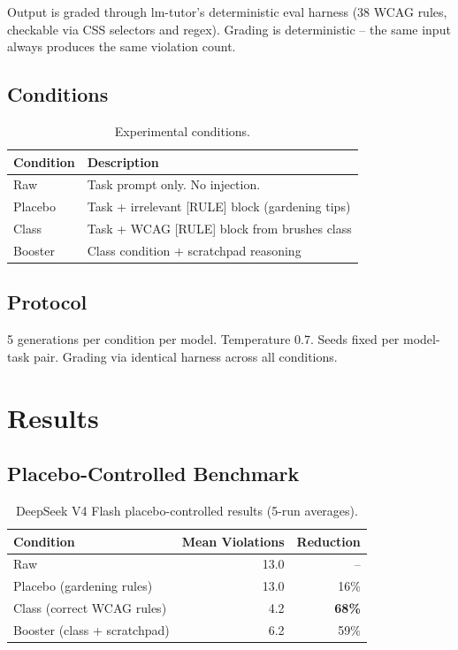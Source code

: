 \documentclass{article}
\begin{document}
Output is graded through lm-tutor's deterministic eval harness (38 WCAG rules,
checkable via CSS selectors and regex). Grading is deterministic -- the same
input always produces the same violation count.

\subsection{Conditions}

\begin{table}[h]
\centering
\begin{tabular}{ll}
\toprule
Condition & Description \\
\midrule
Raw & Task prompt only. No injection. \\
Placebo & Task + irrelevant [RULE] block (gardening tips) \\
Class & Task + WCAG [RULE] block from brushes class \\
Booster & Class condition + scratchpad reasoning \\
\bottomrule
\end{tabular}
\caption{Experimental conditions.}\label{tab:conditions}
\end{table}

\subsection{Protocol}

5 generations per condition per model. Temperature 0.7. Seeds fixed per
model-task pair. Grading via identical harness across all conditions.

\section{Results}

\subsection{Placebo-Controlled Benchmark}

\begin{table}[h]
\centering
\begin{tabular}{lrr}
\toprule
Condition & Mean Violations & Reduction \\
\midrule
Raw & 13.0 & -- \\
Placebo (gardening rules) & 13.0 & 16\% \\
Class (correct WCAG rules) & 4.2 & \textbf{68\%} \\
Booster (class + scratchpad) & 6.2 & 59\% \\
\bottomrule
\end{tabular}
\caption{DeepSeek V4 Flash placebo-controlled results (5-run averages).}\label{tab:placebo}
\end{table}
\end{document}
